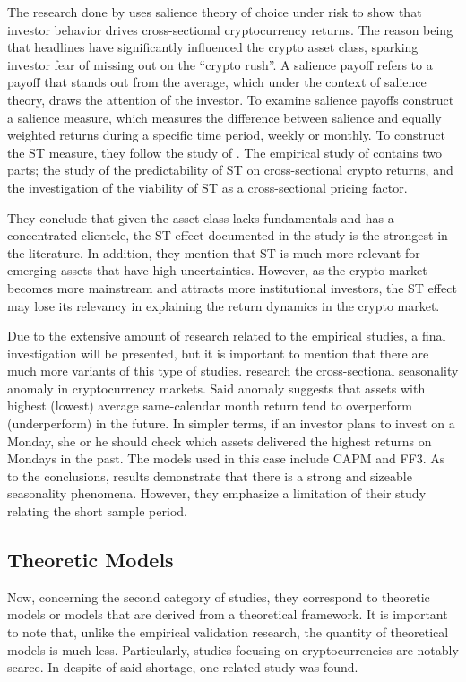 The research done by \parencite{CAI2024107052} uses salience theory of choice under risk to show that investor behavior drives cross-sectional cryptocurrency returns. The reason being that headlines have significantly influenced the crypto asset class, sparking investor fear of missing out on the ``crypto rush''. A salience payoff refers to a payoff that stands out from the average, which under the context of salience theory, draws the attention of the investor. To examine salience payoffs \parencite{CAI2024107052} construct a salience measure, which measures the difference between salience and equally weighted returns during a specific time period, weekly or monthly. To construct the ST measure, they follow the study of \parencite{COSEMANS2021460}. The empirical study of \parencite{CAI2024107052} contains two parts; the study of the predictability of ST on cross-sectional crypto returns, and the investigation of the viability of ST as a cross-sectional pricing factor. 

They conclude that given the asset class lacks fundamentals and has a concentrated clientele, the ST effect documented in the study is the strongest in the literature. In addition, they mention that ST is much more relevant for emerging assets that have high uncertainties. However, as the crypto market becomes more mainstream and attracts more institutional investors, the ST effect may lose its relevancy in explaining the return dynamics in the crypto market.  

Due to the extensive amount of research related to the empirical studies, a final investigation will be presented, but it is important to mention that there are much more variants of this type of studies. \parencite{Long2020} research the cross-sectional seasonality anomaly in cryptocurrency markets. Said anomaly suggests that assets with highest (lowest) average same-calendar month return tend to overperform (underperform) in the future. In simpler terms, if an investor plans to invest on a Monday, she or he should check which assets delivered the highest returns on Mondays in the past. The models used in this case include CAPM and FF3. As to the conclusions, results demonstrate that there is a strong and sizeable seasonality phenomena. However, they emphasize a limitation of their study relating the short sample period.

\subsection{Theoretic Models}
Now, concerning the second category of studies, they correspond to theoretic models or models that are derived from a theoretical framework. It is important to note that, unlike the empirical validation research, the quantity of theoretical models is much less. Particularly, studies focusing on cryptocurrencies are notably scarce. In despite of said shortage, one related study was found.

